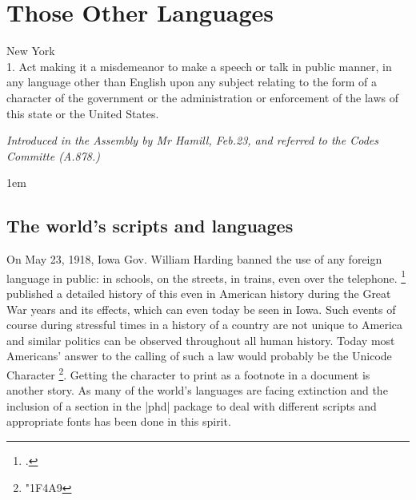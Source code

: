 \newfontfamily{}
\makeatletter
\@specialfalse
\makeatother




\chapter{Those Other Languages}
\label{ch:languages}

\epigraph{New York\\
          1. Act making it a misdemeanor to make a speech or talk in public manner, in any language other
than English upon any subject relating to the form of a character of the government or the administration or enforcement of the laws of this state or the United States. }{\itshape Introduced in the Assembly by Mr Hamill, Feb.23, and referred to the Codes Committe (A.878.)}

\parindent1em



\section{The world's scripts and languages}


On May 23, 1918, Iowa Gov. William Harding banned the use of any foreign language in public: in schools, on the streets, in trains, even over the telephone.   \footcite{frese} published a detailed history of this even in American history during the Great War years and its effects, which can even today be seen in Iowa. Such events of course during stressful times in a history of a country are not unique to America and similar politics can be observed throughout all human history. Today most Americans' answer to the calling of such a law would probably be the Unicode Character \footnote{\protect\emoji\protect\char"1F4A9}. Getting the character to print as a footnote in a document is another story. As many of the world's languages are facing extinction and the inclusion of a section in the |phd| package to deal with different scripts and appropriate fonts has been done in this spirit.

